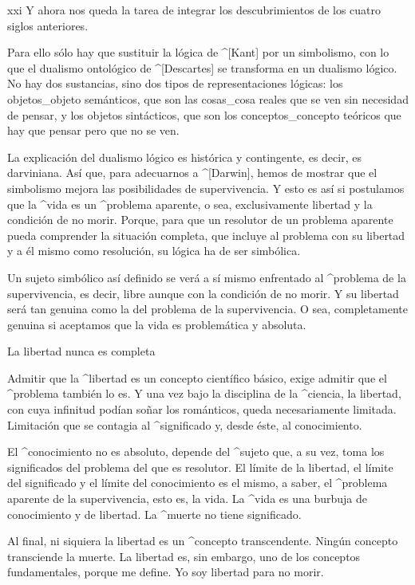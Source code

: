 \vfill\break

\siglo xxi Y ahora nos queda la tarea de integrar los
descubrimientos de los cuatro siglos anteriores.

\noindent
Para ello sólo hay que sustituir la lógica de ^[Kant] por un simbolismo,
con lo que el dualismo ontológico de ^[Descartes] se transforma en un
dualismo lógico. No hay dos sustancias, sino dos tipos de
representaciones lógicas: los objetos_{objeto} semánticos, que son las
cosas_{cosa} reales que se ven sin necesidad de pensar, y los objetos
sintácticos, que son los conceptos_{concepto} teóricos que hay que
pensar pero que no se ven.
\endpoints

La explicación del dualismo lógico es histórica y contingente, es decir,
es darviniana. Así que, para adecuarnos a ^[Darwin], hemos de mostrar
que el simbolismo mejora las posibilidades de supervivencia. Y esto es
así si postulamos que la ^{vida} es un ^{problema aparente}, o sea,
exclusivamente libertad y la condición de no morir. Porque, para que un
resolutor de un problema aparente pueda comprender la situación
completa, que incluye al problema con su libertad y a él mismo como
resolución, su lógica ha de ser simbólica.

Un sujeto simbólico así definido se verá a sí mismo enfrentado al
^{problema de la supervivencia}, es decir, libre aunque con la condición
de no morir. Y su libertad será tan genuina como la del problema de la
supervivencia. O sea, completamente genuina si aceptamos que la vida es
problemática y absoluta.


\Section La libertad nunca es completa

Admitir que la ^{libertad} es un concepto científico básico, exige
admitir que el ^{problema} también lo es. Y una vez bajo la disciplina
de la ^{ciencia}, la libertad, con cuya infinitud podían soñar los
románticos, queda necesariamente limitada. Limitación que se contagia al
^{significado} y, desde éste, al conocimiento.

El ^{conocimiento} no es absoluto, depende del ^{sujeto} que, a su vez,
toma los significados del problema del que es resolutor. El límite de la
libertad, el límite del significado y el límite del conocimiento es el
mismo, a saber, el ^{problema aparente} de la supervivencia, esto es, la
vida. La ^{vida} es una burbuja de conocimiento y de libertad. La
^{muerte} no tiene significado.

Al final, ni siquiera la libertad es un ^{concepto transcendente}.
Ningún concepto transciende la muerte. La libertad es, sin embargo, uno
de los conceptos fundamentales, porque me define. Yo soy libertad para
no morir.


